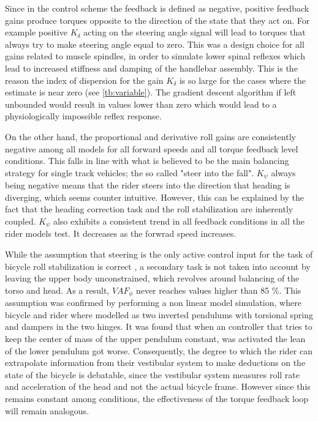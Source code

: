 Since in the control scheme the feedback is defined as negative, positive feedback gains produce torques opposite to the direction of the state that they act on. For example   positive \ensuremath{K_\delta} acting on the steering angle signal will lead to torques that always try to make steering angle equal to zero. This was a design choice for all gains related to muscle spindles, in order to simulate lower spinal reflexes which  lead to increased stiffness and damping of the handlebar assembly. This is the reason the index of dispersion for the gain \ensuremath{K_\delta} is so large for the cases where the estimate is near zero (see \cref{tb:variable}). The gradient descent algorithm if left unbounded would result in values lower than zero which would lead to a physiologically impossible reflex response.  

On the other hand, the proportional and derivative roll gains  are consistently negative among all models for all forward speeds and all torque feedback level conditions. This falls in line with what is believed to be the main balancing strategy for single track vehicles; the so called "steer into the fall". \ensuremath{K_\psi} always being negative means that the rider steers into the direction that heading is diverging, which  seems counter intuitive. However, this can be explained by the fact that the heading correction task and the roll stabilization are inherently coupled. \ensuremath{K_\psi} also exhibits a  consistent trend in all feedback conditions in all the rider models test. It decreases as the forwrad speed increases.  

While the assumption that steering is the only active control input for the task of bicycle roll stabilization is correct , a secondary task is not taken into account by leaving the upper body unconstrained, which revolves around balancing of the torso and head. As a result, \ensuremath{\mathit{VAF}_\phi} never reaches values higher than 85 \%. This assumption  was  confirmed by performing a non linear model simulation, where bicycle and rider where modelled as two inverted pendulums with torsional spring and dampers in the two hinges. It was found that when an  controller that tries to keep the center of mass of the upper pendulum constant, was activated the lean of the lower pendulum got worse. Consequently, the degree to which the rider can extrapolate information from their vestibular system to make deductions on the state of the bicycle is debatable, since the vestibular system measures roll rate and acceleration of the head and not the actual bicycle frame. However since this remains constant among conditions, the effectiveness of the torque feedback loop will remain analogous.

